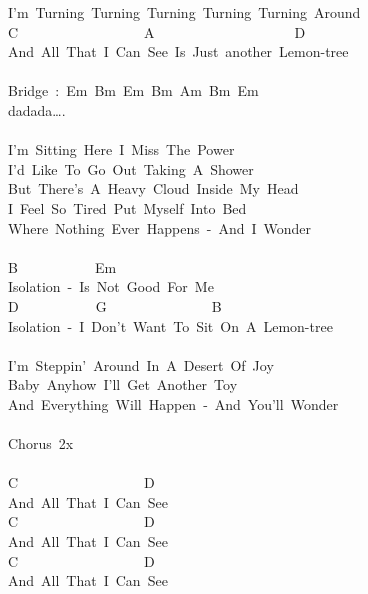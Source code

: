 \documentclass[]{book}
\begin{document}
\hspace*{0.333em}I'm~Turning~Turning~Turning~Turning~Turning~Around\\
C~~~~~~~~~~~~~~~~~~A~~~~~~~~~~~~~~~~~~~~D\\
And~All~That~I~Can~See~Is~Just~another~Lemon-tree\\
~\\
Bridge~:~Em~Bm~Em~Bm~Am~Bm~Em\\
\hspace*{0.333em}\hspace*{0.333em}\hspace*{0.333em}\hspace*{0.333em}\hspace*{0.333em}\hspace*{0.333em}\hspace*{0.333em}\hspace*{0.333em}\hspace*{0.333em}dadada\ldots.\\
~\\
I'm~Sitting~Here~I~Miss~The~Power\\
I'd~Like~To~Go~Out~Taking~A~Shower\\
But~There's~A~Heavy~Cloud~Inside~My~Head\\
I~Feel~So~Tired~Put~Myself~Into~Bed\\
Where~Nothing~Ever~Happens~-~And~I~Wonder\\
~\\
B~~~~~~~~~~~Em\\
Isolation~-~Is~Not~Good~For~Me\\
D~~~~~~~~~~~G~~~~~~~~~~~~~~~B\\
Isolation~-~I~Don't~Want~To~Sit~On~A~Lemon-tree\\
~\\
I'm~Steppin'~Around~In~A~Desert~Of~Joy\\
Baby~Anyhow~I'll~Get~Another~Toy\\
And~Everything~Will~Happen~-~And~You'll~Wonder\\
~\\
Chorus~2x\\
~\\
C~~~~~~~~~~~~~~~~~~D\\
And~All~That~I~Can~See\\
C~~~~~~~~~~~~~~~~~~D\\
And~All~That~I~Can~See\\
C~~~~~~~~~~~~~~~~~~D\\
And~All~That~I~Can~See\\
\end{document}
